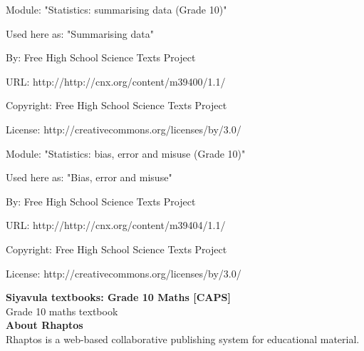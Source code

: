       \par\vspace{9pt}\noindent\begin{minipage}{\textwidth}
      Module: "Statistics: summarising data (Grade 10)" \par\nopagebreak\noindent
      Used here as: "Summarising data" \par\nopagebreak\noindent
        By: Free High School Science Texts Project\par\nopagebreak\noindent
      URL: http://http://cnx.org/content/m39400/1.1/\par\nopagebreak\noindent
      \par\nopagebreak\noindent
      Copyright: Free High School Science Texts Project\par\nopagebreak\noindent
      License:  http://creativecommons.org/licenses/by/3.0/\par\nopagebreak\noindent
      \par\end{minipage}
      \par\vspace{9pt}\noindent\begin{minipage}{\textwidth}
      Module: "Statistics: bias, error and misuse (Grade 10)" \par\nopagebreak\noindent
      Used here as: "Bias, error and misuse" \par\nopagebreak\noindent
        By: Free High School Science Texts Project\par\nopagebreak\noindent
      URL: http://http://cnx.org/content/m39404/1.1/\par\nopagebreak\noindent
      \par\nopagebreak\noindent
      Copyright: Free High School Science Texts Project\par\nopagebreak\noindent
      License:  http://creativecommons.org/licenses/by/3.0/\par\nopagebreak\noindent
      \par\end{minipage}
      
    \newpage 
    \pagestyle{empty}
    \def\leftmark{}
    \def\rightmark{}
    \noindent
    
      \textbf{Siyavula textbooks: Grade 10 Maths [CAPS]} \\
      \noindent Grade 10 maths textbook
      \vspace*{0.5in} \\
    

    \noindent\textbf{About Rhaptos} \\
    
Rhaptos is a web-based collaborative publishing system for educational material.
      
    
  
